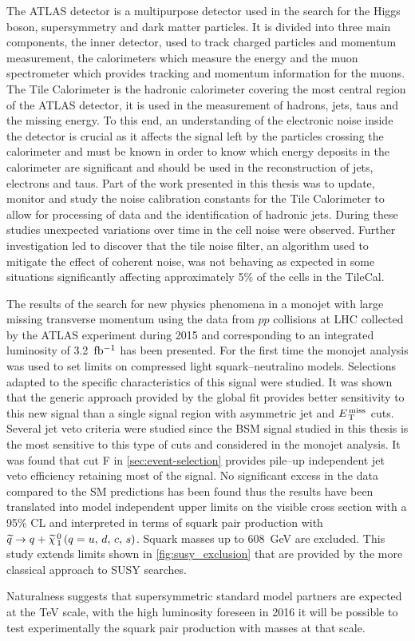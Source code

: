 The ATLAS detector is a multipurpose detector used in the search for the Higgs
boson, supersymmetry and dark matter particles. It is divided into three main
components, the inner detector, used to track charged particles and momentum
measurement, the calorimeters which measure the energy and the muon spectrometer
which provides tracking and momentum information for the muons. The Tile
Calorimeter is the hadronic calorimeter covering the most central region of the
ATLAS detector, it is used in the measurement of hadrons, jets, taus and the
missing energy. To this end, an understanding of the electronic noise inside the
detector is crucial as it affects the signal left by the particles crossing the
calorimeter and must be known in order to know which energy deposits in the
calorimeter are significant and should be used in the reconstruction of jets,
electrons and taus. Part of the work presented in this thesis was to update,
monitor and study the noise calibration constants for the Tile Calorimeter to
allow for processing of data and the identification of hadronic jets. During
these studies unexpected variations over time in the cell noise were
observed. Further investigation led to discover that the tile noise filter, an
algorithm used to mitigate the effect of coherent noise, was not behaving as
expected in some situations significantly affecting approximately 5\% of the
cells in the TileCal.

The results of the search for new physics phenomena in a monojet with large
missing transverse momentum using the data from $pp$ collisions at LHC collected
by the ATLAS experiment during 2015 and corresponding to an integrated
luminosity of 3.2~$\mbox{fb$^{-1}$}$ has been presented. For the first time the monojet
analysis was used to set limits on compressed light squark--neutralino
models. Selections adapted to the specific characteristics of this signal were
studied. It was shown that the generic approach provided by the global fit
provides better sensitivity to this new signal than a single signal region with
asymmetric jet and $E_\mathrm{\, T}^\mathrm{\, miss}$ cuts. Several jet veto criteria were studied since the
BSM signal studied in this thesis is the most sensitive to this type of cuts and
considered in the monojet analysis. It was found that cut F in
\cref{sec:event-selection} provides pile--up independent jet veto efficiency
retaining most of the signal. No significant excess in the data compared to the
SM predictions has been found thus the results have been translated into model
independent upper limits on the visible cross section with a 95\% CL and
interpreted in terms of squark pair production with $\widetilde{q} \rightarrow q + \widetilde{\chi}_{\, 1}^{\, 0}\, (q = u,\, d,\, c,\, s)$. Squark masses
up to 608~GeV are excluded. This study extends limits shown in
\cref{fig:susy_exclusion} that are provided by the more classical approach to
SUSY searches.

Naturalness suggests that supersymmetric standard model partners are expected at
the TeV scale, with the high luminosity foreseen in 2016 it will be possible to
test experimentally the squark pair production with masses at that scale.
